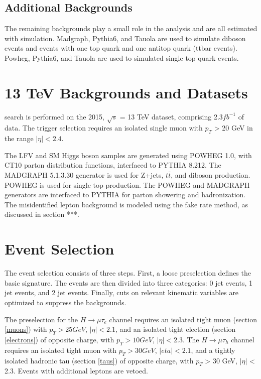 \documentclass[oneside, letterpaper, oldfontcommands]{memoir}
\begin{document}
{{\subsection{Additional Backgrounds}

\qquad The remaining backgrounds play a small role in the analysis and are all estimated with simulation. Madgraph, Pythia6, and Tauola are used to simulate diboson events and events with one top quark and one antitop quark (ttbar events). Powheg, Pythia6, and Tauola are used to simulated single top quark events.

\section{13 TeV Backgrounds and Datasets}

\qquadThe search is performed on the 2015, $\sqrt{s}$ = 13 TeV dataset, comprising 2.3$fb^{-1}$ of data. The trigger selection requires an isolated single muon with $p_{T}$ > 20 GeV in the range $|\eta| < 2.4$.

\qquad The LFV and SM Higgs boson samples are generated using POWHEG 1.0, with CT10 parton distribution functions, interfaced to PYTHIA 8.212. The MADGRAPH 5.1.3.30 generator is used for Z+jets, $t\bar{t}$, and diboson production. POWHEG is used for single top production. The POWHEG and MADGRAPH generators are interfaced to PYTHIA for parton showering and hadronization. The misidentified lepton background is modeled using the fake rate method, as discussed in section ***. 

  
\section{Event Selection}
\qquad The event selection consists of three steps. First, a loose preselection defines the basic signature. The events are then divided into three categories: 0 jet events, 1 jet events, and 2 jet events. Finally, cuts on relevant kinematic variables are optimized to suppress the backgrounds. 

\qquad The preselection for the $H \rightarrow \mu\tau_{e}$ channel requires an isolated tight muon (section \ref{muons}) with $p_{T} > 25 GeV$, $|\eta| < 2.1$, and an isolated tight election (section \ref{electrons}) of opposite charge, with $p_{T} > 10 GeV$, $|\eta| < 2.3$. The $H \rightarrow \mu\tau_{h}$ channel requires an isolated tight muon with $p_{T} > 30 GeV$, $|eta| < 2.1$, and a tightly isolated hadronic tau (section \ref{taus}) of opposite charge, with $p_{T}$ > 30 GeV, $|\eta|$ < 2.3. Events with additional leptons are vetoed.

}}
\end{document}
